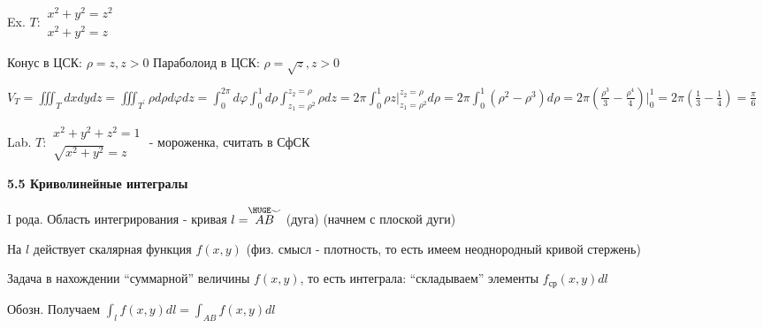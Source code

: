 \documentclass[12pt]{article}
\begin{document}
    Ex. $T: \begin{matrix}x^2 + y^2 = z^2 \\ x^2 + y^2 = z\end{matrix}$

    Конус в ЦСК: $\rho = z, z > 0$
    Параболоид в ЦСК: $\rho = \sqrt{z}, z > 0$

    $V_T = \iiint_T dxdydz = \iiint_{T^\prime}\rho d\rho d\varphi dz = \int_0^{2\pi} d\varphi \int_0^1 d \rho \int_{z_1 = \rho^2}^{z_2=\rho} \rho dz =
    2\pi \int_0^1 \rho z \Big|_{z_1 = \rho^2}^{z_2=\rho} d\rho = 2\pi \int_0^1 (\rho^2 - \rho^3) d\rho =
    2\pi (\frac{\rho^3}{3} - \frac{\rho^4}{4}) \Big|_0^1 = 2\pi (\frac{1}{3} - \frac{1}{4}) = \frac{\pi}{6}$

    Lab. $T: \begin{matrix}x^2 + y^2 + z^2 = 1 \\ \sqrt{x^2 + y^2} = z\end{matrix}$ - мороженка, считать в СфСК


    \textbf{5.5 Криволинейные интегралы}

    I рода. Область интегрирования - кривая $l = \stackrel{\HUGE\smile}{AB}$ (дуга) (начнем с плоской дуги)

    На $l$ действует скалярная функция $f(x, y)$ (физ. смысл - плотность, то есть имеем неоднородный кривой стержень)

    Задача в нахождении \enquote{суммарной} величины $f(x, y)$, то есть интеграла: \enquote{складываем} элементы $f_{\text{ср}}(x, y) dl$


    Обозн. Получаем $\int_l f(x, y)dl = \int_{AB} f(x, y)dl$
\end{document}
